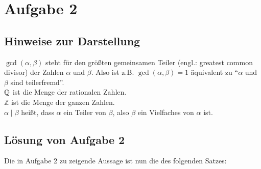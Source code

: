 \section{Aufgabe 2}

\subsection*{Hinweise zur Darstellung}

$\gcd(\alpha, \beta)$ steht für den größten gemeinsamen Teiler (engl.: greatest common divisor) der Zahlen $\alpha$ 
und $\beta$. Also ist z.B. $\gcd(\alpha, \beta) = 1$ äquivalent zu "`$\alpha$ und $\beta$ sind teilerfremd"'.\\
$\mathbb{Q}$ ist die Menge der rationalen Zahlen.\\
$\mathbb{Z}$ ist die Menge der ganzen Zahlen.\\
$\alpha \mid \beta$ heißt, dass $\alpha$ ein Teiler von $\beta$, also $\beta$ ein Vielfaches von $\alpha$ ist.

\subsection*{Lösung von Aufgabe 2}

Die in Aufgabe 2 zu zeigende Aussage ist nun die des folgenden Satzes:

